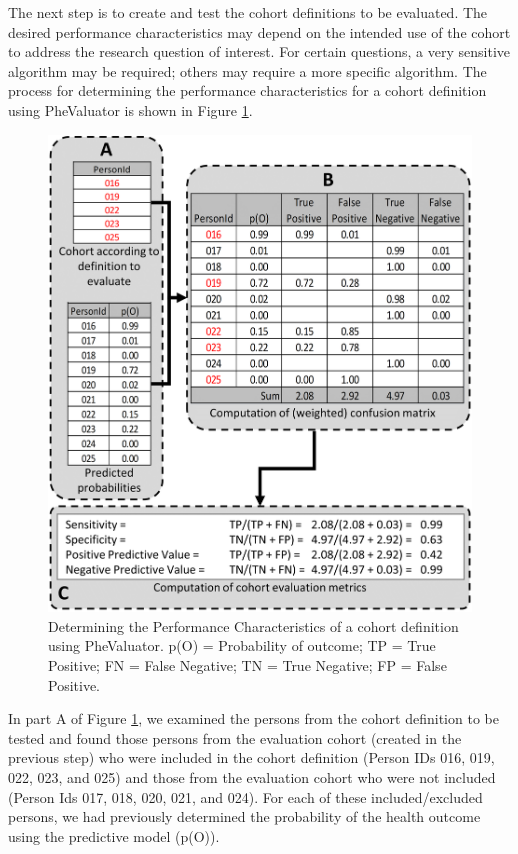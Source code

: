 \documentclass[11pt]{book}
\theoremstyle{definition}
\theoremstyle{definition}
\theoremstyle{definition}
\theoremstyle{remark}
\begin{document}
The next step is to create and test the cohort definitions to be
evaluated. The desired performance characteristics may depend on the
intended use of the cohort to address the research question of interest.
For certain questions, a very sensitive algorithm may be required;
others may require a more specific algorithm. The process for
determining the performance characteristics for a cohort definition
using PheValuator is shown in Figure \ref{fig:phevaluatorDiagram}.

\begin{figure}

{\centering \includegraphics[width=1\linewidth]{images/ClinicalValidity/PheValuatorEvaluation} 

}

\caption{Determining the Performance Characteristics of a cohort definition using PheValuator. p(O) = Probability of outcome; TP = True Positive; FN = False Negative; TN = True Negative; FP = False Positive.}\label{fig:phevaluatorDiagram}
\end{figure}

In part A of Figure \ref{fig:phevaluatorDiagram}, we examined the
persons from the cohort definition to be tested and found those persons
from the evaluation cohort (created in the previous step) who were
included in the cohort definition (Person IDs 016, 019, 022, 023, and
025) and those from the evaluation cohort who were not included (Person
Ids 017, 018, 020, 021, and 024). For each of these included/excluded
persons, we had previously determined the probability of the health
outcome using the predictive model (p(O)).
\end{document}
